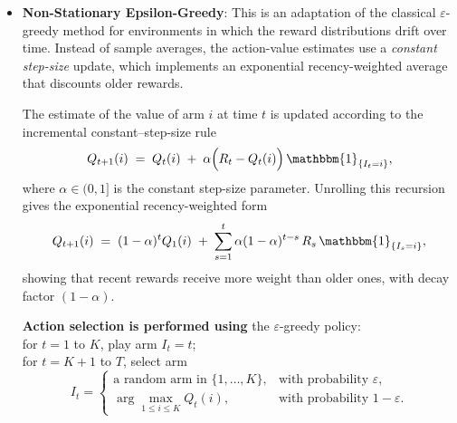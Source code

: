 \documentclass{scrartcl}
\begin{document}
\begin{itemize}
    SW-UCB constructs an upper-confidence bound using:  
    \[
        c_t(\tau, i)
        = B \sqrt{\frac{\xi \log (t \wedge \tau)}{N_t(\tau, i)}},
    \]
    where $B$ is the upper-bound on the rewards, $t \wedge \tau$ denotes the minimum of t and $\tau$ and $\xi > 1/2$ controls exploration.

    \textbf{Action selection is performed by}\\
\quad for $t = 1$ to $K$, play arm $I_t = t$;\\
\quad for $t = K+1$ to $T$, play arm
\[
    I_t
    = \arg\max_{1 \le i \le K}
    \left(
        \bar{X}_t(\tau,i) + c_t(\tau,i)
    \right).
\]

    After receiving the reward $X_t(a_t)$, the sliding-window statistics are updated by discarding observations older than $\tau$ rounds and inserting the new one:
    \[
        N_{t+1}(\gamma, i)
        = \sum_{s = t-\tau+2}^{t+1} \gamma^{\,t+1-s}\, \mathbbm{1}_{\{I_s = i\}},
    \]
    \[
        \bar{X}_{t+1}(\tau, a)
        = \frac{1}{N_{t+1}(\tau, a)}
          \sum_{s = t-\tau+2}^{t+1} X_s(i)\,\mathbbm{1}_{\{I_s = i\}},
    \]
    \[
        c_{t+1}(\tau, i)
        = B \sqrt{\frac{\xi \log((t+1) \wedge \tau)}{N_{t+1}(\tau, i)}}.
    \]

    \item \textbf{Non-Stationary Epsilon-Greedy}\cite{epsilon_greedy_ns}: 
    This is an adaptation of the classical $\varepsilon$-greedy method for
    environments in which the reward distributions drift over time.  
    Instead of sample averages, the action-value estimates use a
    \emph{constant step-size} update, which implements an
    exponential recency-weighted average that discounts older rewards.

    The estimate of the value of arm $i$ at time $t$ is updated according to
    the incremental constant–step-size rule  
    \[
        Q_{t+1}(i)
        \;=\;
        Q_t(i)
        \;+\;
        \alpha\Big(R_t - Q_t(i)\Big)\,\mathbbm{1}_{\{I_t = i\}},
    \]
    where $\alpha \in (0,1]$ is the constant step-size parameter.  
    Unrolling this recursion gives the exponential recency-weighted form
    \[
        Q_{t+1}(i)
        \;=\;
        (1-\alpha)^{t} Q_1(i)
        \;+\;
        \sum_{s=1}^{t}
        \alpha(1-\alpha)^{t-s}\,R_s\,\mathbbm{1}_{\{I_s=i\}},
    \]
    showing that recent rewards receive more weight than older ones, with
    decay factor $(1-\alpha)$.

    \textbf{Action selection is performed using} the $\varepsilon$-greedy policy:\\
\quad for $t = 1$ to $K$, play arm $I_t = t$;\\
\quad for $t = K+1$ to $T$, select arm
    \[
        I_t
        =
        \begin{cases}
            \text{a random arm in }\{1,\dots,K\}, & \text{with probability }\varepsilon, \\[6pt]
            \displaystyle \arg\max_{1\le i\le K} Q_t(i),     & \text{with probability }1-\varepsilon.
        \end{cases}
    \]


\end{itemize}
\end{document}
